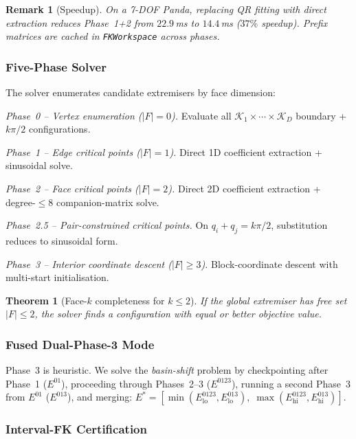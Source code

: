 \documentclass[journal]{IEEEtran}
\newtheorem{theorem}{Theorem}
\newtheorem{remark}{Remark}
\begin{document}
\begin{remark}[Speedup]
On a 7-DOF Panda, replacing QR fitting with direct extraction reduces
Phase~1+2 from $22.9$\,ms to $14.4$\,ms ($37\%$ speedup).
Prefix matrices are cached in \texttt{FKWorkspace} across phases.
\end{remark}

\subsubsection{Five-Phase Solver}\label{sec:five_phase}

The solver enumerates candidate extremisers by face dimension:

\emph{Phase~0 -- Vertex enumeration ($|F|=0$).}
Evaluate all $\mathcal{K}_1 \times \cdots \times \mathcal{K}_D$
boundary + $k\pi/2$ configurations.

\emph{Phase~1 -- Edge critical points ($|F|=1$).}
Direct 1D coefficient extraction + sinusoidal solve.

\emph{Phase~2 -- Face critical points ($|F|=2$).}
Direct 2D coefficient extraction + degree-$\leq 8$ companion-matrix solve.

\emph{Phase~2.5 -- Pair-constrained critical points.}
On $q_i + q_j = k\pi/2$, substitution reduces to sinusoidal form.

\emph{Phase~3 -- Interior coordinate descent ($|F|\geq 3$).}
Block-coordinate descent with multi-start initialisation.

\begin{theorem}[Face-$k$ completeness for $k \leq 2$]\label{thm:face_complete}
If the global extremiser has free set $|F|\leq 2$, the solver
finds a configuration with equal or better objective value.
\end{theorem}

\subsubsection{Fused Dual-Phase-3 Mode}\label{sec:dual_phase3}

Phase~3 is heuristic.
We solve the \emph{basin-shift} problem by checkpointing after Phase~1
($E^{01}$), proceeding through Phases~2--3 ($E^{0123}$), running a
second Phase~3 from $E^{01}$ ($E^{013}$), and merging:
$E^* = [\min(E^{0123}_\text{lo}, E^{013}_\text{lo}),\;
        \max(E^{0123}_\text{hi}, E^{013}_\text{hi})]$.

\subsubsection{Interval-FK Certification}\label{sec:ifk_cert}
\end{document}
